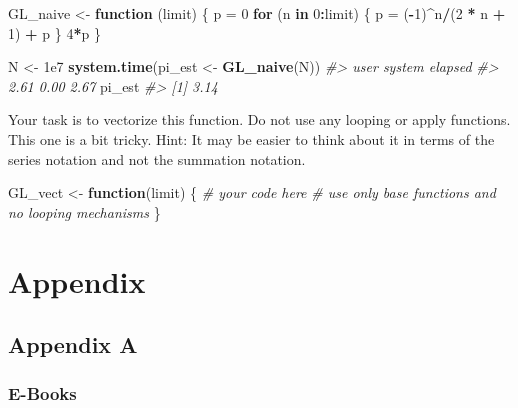 \documentclass[]{book}
\newenvironment{Shaded}{\begin{snugshade}}{\end{snugshade}}
\newcommand{\KeywordTok}[1]{\textcolor[rgb]{0.13,0.29,0.53}{\textbf{#1}}}
\newcommand{\DecValTok}[1]{\textcolor[rgb]{0.00,0.00,0.81}{#1}}
\newcommand{\FloatTok}[1]{\textcolor[rgb]{0.00,0.00,0.81}{#1}}
\newcommand{\StringTok}[1]{\textcolor[rgb]{0.31,0.60,0.02}{#1}}
\newcommand{\CommentTok}[1]{\textcolor[rgb]{0.56,0.35,0.01}{\textit{#1}}}
\newcommand{\ControlFlowTok}[1]{\textcolor[rgb]{0.13,0.29,0.53}{\textbf{#1}}}
\newcommand{\OperatorTok}[1]{\textcolor[rgb]{0.81,0.36,0.00}{\textbf{#1}}}
\newcommand{\NormalTok}[1]{#1}
\theoremstyle{definition}
\theoremstyle{definition}
\theoremstyle{definition}
\theoremstyle{remark}
\begin{document}
\begin{Shaded}
\begin{Highlighting}[]
\NormalTok{GL_naive <-}\StringTok{ }\ControlFlowTok{function}\NormalTok{ (limit) \{}
\NormalTok{  p =}\StringTok{ }\DecValTok{0}
  \ControlFlowTok{for}\NormalTok{ (n }\ControlFlowTok{in} \DecValTok{0}\OperatorTok{:}\NormalTok{limit) \{}
\NormalTok{    p =}\StringTok{ }\NormalTok{(}\OperatorTok{-}\DecValTok{1}\NormalTok{)}\OperatorTok{^}\NormalTok{n}\OperatorTok{/}\NormalTok{(}\DecValTok{2} \OperatorTok{*}\StringTok{ }\NormalTok{n }\OperatorTok{+}\StringTok{ }\DecValTok{1}\NormalTok{) }\OperatorTok{+}\StringTok{ }\NormalTok{p}
\NormalTok{    \}}
  \DecValTok{4}\OperatorTok{*}\NormalTok{p}
\NormalTok{\}}

\NormalTok{N <-}\StringTok{ }\FloatTok{1e7}
\KeywordTok{system.time}\NormalTok{(pi_est <-}\StringTok{ }\KeywordTok{GL_naive}\NormalTok{(N))}
\CommentTok{#>    user  system elapsed }
\CommentTok{#>    2.61    0.00    2.67}
\NormalTok{pi_est}
\CommentTok{#> [1] 3.14}
\end{Highlighting}
\end{Shaded}

Your task is to vectorize this function. Do not use any looping or apply
functions. This one is a bit tricky. Hint: It may be easier to think
about it in terms of the series notation and not the summation notation.

\begin{Shaded}
\begin{Highlighting}[]
\NormalTok{GL_vect <-}\StringTok{ }\ControlFlowTok{function}\NormalTok{(limit) \{}
  \CommentTok{# your code here}
  \CommentTok{# use only base functions and no looping mechanisms}
\NormalTok{\}}
\end{Highlighting}
\end{Shaded}

\part{Appendix}\label{part-appendix}

\chapter{Appendix A}\label{appendix-resources}

\section{E-Books}\label{e-books}
\end{document}
